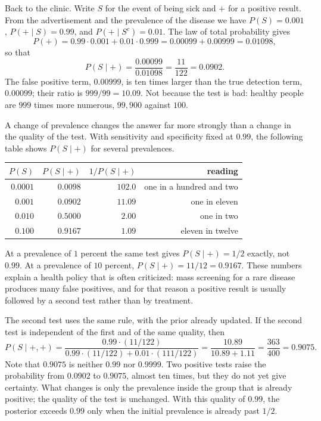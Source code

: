 Back to the clinic. Write $S$ for the event of being sick and $+$ for a positive result.
From the advertisement and the prevalence of the disease we have $P(S)=0.001$,
$P(+\mid S)=0.99$, and $P(+\mid S^{c})=0.01$. The law of total probability gives
\[
P(+)=0.99\cdot 0.001+0.01\cdot 0.999=0.00099+0.00999=0.01098,
\]
so that
\[
P(S\mid +)=\frac{0.00099}{0.01098}=\frac{11}{122}=0.0902 .
\]
The false positive term, $0.00999$, is ten times larger than the true detection term,
$0.00099$; their ratio is $999/99=10.09$. Not because the test is bad: healthy people are
$999$ times more numerous, $99{,}900$ against $100$.

A change of prevalence changes the answer far more strongly than a change in the quality of
the test. With sensitivity and specificity fixed at $0.99$, the following table shows
$P(S\mid +)$ for several prevalences.

\begin{center}
\small
\begin{tabular}{rrrr}
\hline
$P(S)$ & $P(S\mid +)$ & $1/P(S\mid +)$ & reading \\
\hline
$0.0001$ & $0.0098$ & $102.0$ & one in a hundred and two \\
$0.001$ & $0.0902$ & $11.09$ & one in eleven \\
$0.010$ & $0.5000$ & $2.00$ & one in two \\
$0.100$ & $0.9167$ & $1.09$ & eleven in twelve \\
\hline
\end{tabular}
\end{center}

At a prevalence of $1$ percent the same test gives $P(S\mid+)=1/2$ exactly, not $0.99$.
At a prevalence of $10$ percent, $P(S\mid+)=11/12=0.9167$. These numbers explain a health
policy that is often criticized: mass screening for a rare disease produces many false
positives, and for that reason a positive result is usually followed by a second test
rather than by treatment.

The second test uses the same rule, with the prior already updated. If the second test is
independent of the first and of the same quality, then
\[
P(S\mid +,+)=\frac{0.99\cdot (11/122)}{0.99\cdot (11/122)+0.01\cdot (111/122)}
=\frac{10.89}{10.89+1.11}=\frac{363}{400}=0.9075 .
\]
Note that $0.9075$ is neither $0.99$ nor $0.9999$. Two positive tests raise the probability
from $0.0902$ to $0.9075$, almost ten times, but they do not yet give certainty. What
changes is only the prevalence inside the group that is already positive; the quality of
the test is unchanged. With this quality of $0.99$, the posterior exceeds $0.99$ only when
the initial prevalence is already past $1/2$.

